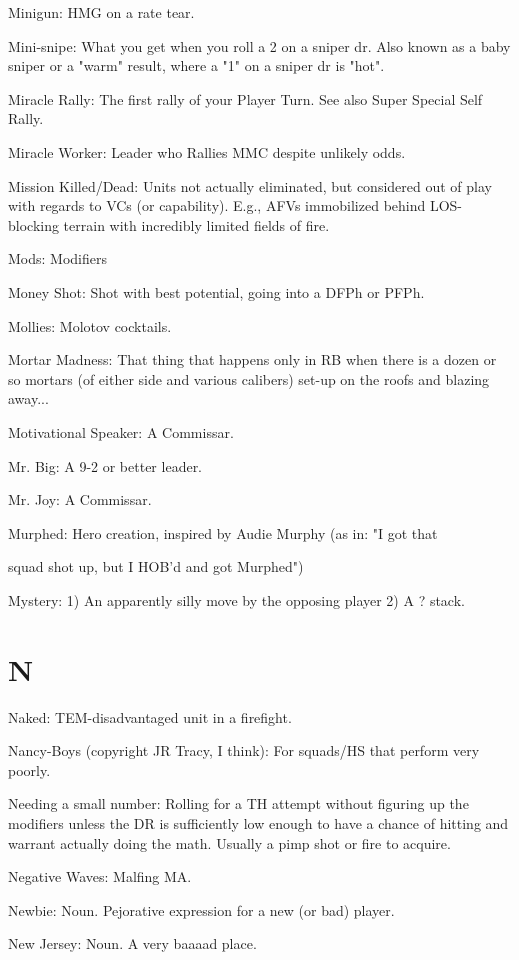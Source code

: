\documentclass[letterpaper]{article}
\begin{document}
Minigun: HMG on a rate tear.

Mini-snipe: What you get when you roll a 2 on a sniper dr. Also known as a baby sniper or a "warm" result, where a "1" on a sniper dr is "hot".

Miracle Rally: The first rally of your Player Turn. See also Super Special Self Rally.

Miracle Worker: Leader who Rallies MMC despite unlikely odds.

Mission Killed/Dead: Units not actually eliminated, but considered out of play with regards to VCs (or capability). E.g., AFVs immobilized behind LOS-blocking terrain with incredibly limited fields of fire.

Mods: Modifiers

Money Shot: Shot with best potential, going into a DFPh or PFPh.

Mollies: Molotov cocktails.

Mortar Madness: That thing that happens only in RB when there is a dozen or so mortars (of either side and various calibers) set-up on the roofs and blazing away...

Motivational Speaker: A Commissar.

Mr. Big: A 9-2 or better leader.

Mr. Joy: A Commissar.

Murphed:  Hero creation, inspired by Audie Murphy (as in:  "I got that

squad shot up, but I HOB'd and got Murphed")

Mystery: 1) An apparently silly move by the opposing player 2) A ? stack.

\section{N}

Naked: TEM-disadvantaged unit in a firefight.

Nancy-Boys (copyright JR Tracy, I think): For squads/HS that perform very poorly.

Needing a small number: Rolling for a TH attempt without figuring up the modifiers unless the DR is sufficiently low enough to have a chance of hitting and warrant actually doing the math. Usually a pimp shot or fire to acquire.

Negative Waves:  Malfing MA.

Newbie: Noun. Pejorative expression for a new (or bad) player.

New Jersey: Noun. A very baaaad place.
\end{document}
